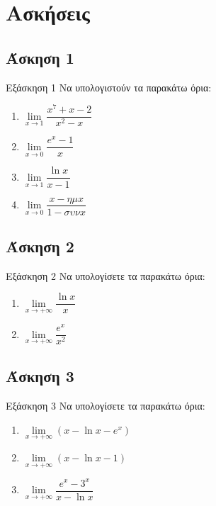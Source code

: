 \documentclass[greek]{beamer}
\begin{document}
\section{Ασκήσεις}
\subsection{Άσκηση 1}
\begin{frame}[label=Άσκηση1,t]{Εξάσκηση 1}
 Να υπολογιστούν τα παρακάτω όρια:
 \begin{enumerate}
  \item<1-> $\lim\limits_{x \to 1}{ \dfrac{x^7+x-2}{x^2-x} }$
  \item<2-> $\lim\limits_{x \to 0}{ \dfrac{e^x-1}{x} }$
  \item<3-> $\lim\limits_{x \to 1}{ \dfrac{\ln x}{x-1} }$
  \item<4-> $\lim\limits_{x \to 0}{ \dfrac{x-ημx}{1-συνx} }$
 \end{enumerate}

\end{frame}

\subsection{Άσκηση 2}
\begin{frame}[label=Άσκηση2,t]{Εξάσκηση 2}
 Να υπολογίσετε τα παρακάτω όρια:
 \begin{enumerate}
  \item<1-> $\lim\limits_{x \to +\infty}{ \dfrac{\ln x}{x} }$
  \item<2-> $\lim\limits_{x \to +\infty}{ \dfrac{e^x}{x^2} }$
 \end{enumerate}

\end{frame}

\subsection{Άσκηση 3}
\begin{frame}[label=Άσκηση3,t]{Εξάσκηση 3}
 Να υπολογίσετε τα παρακάτω όρια:
 \begin{enumerate}
  \item<1-> $\lim\limits_{x \to +\infty}{ (x-\ln x-e^x) }$
  \item<2-> $\lim\limits_{x \to +\infty}{ (x-\ln x-1) }$
  \item<3-> $\lim\limits_{x \to +\infty}{ \dfrac{e^x-3^x}{x-\ln x} }$
 \end{enumerate}

\end{frame}
\end{document}
